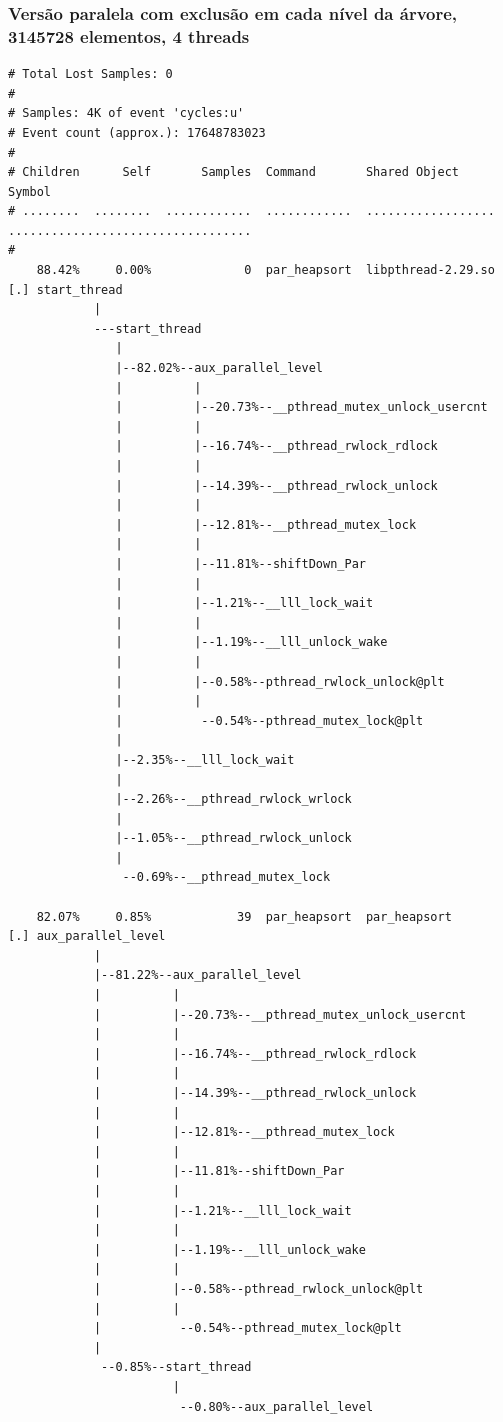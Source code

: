 \documentclass{article}
\begin{document}
\subsubsection{Versão paralela com exclusão em cada nível da árvore, 3145728 elementos, 4 threads}
\scriptsize
\begin{verbatim}
# Total Lost Samples: 0
#
# Samples: 4K of event 'cycles:u'
# Event count (approx.): 17648783023
#
# Children      Self       Samples  Command       Shared Object       Symbol
# ........  ........  ............  ............  ..................  ..................................
#
    88.42%     0.00%             0  par_heapsort  libpthread-2.29.so  [.] start_thread
            |
            ---start_thread
               |
               |--82.02%--aux_parallel_level
               |          |
               |          |--20.73%--__pthread_mutex_unlock_usercnt
               |          |
               |          |--16.74%--__pthread_rwlock_rdlock
               |          |
               |          |--14.39%--__pthread_rwlock_unlock
               |          |
               |          |--12.81%--__pthread_mutex_lock
               |          |
               |          |--11.81%--shiftDown_Par
               |          |
               |          |--1.21%--__lll_lock_wait
               |          |
               |          |--1.19%--__lll_unlock_wake
               |          |
               |          |--0.58%--pthread_rwlock_unlock@plt
               |          |
               |           --0.54%--pthread_mutex_lock@plt
               |
               |--2.35%--__lll_lock_wait
               |
               |--2.26%--__pthread_rwlock_wrlock
               |
               |--1.05%--__pthread_rwlock_unlock
               |
                --0.69%--__pthread_mutex_lock

    82.07%     0.85%            39  par_heapsort  par_heapsort        [.] aux_parallel_level
            |
            |--81.22%--aux_parallel_level
            |          |
            |          |--20.73%--__pthread_mutex_unlock_usercnt
            |          |
            |          |--16.74%--__pthread_rwlock_rdlock
            |          |
            |          |--14.39%--__pthread_rwlock_unlock
            |          |
            |          |--12.81%--__pthread_mutex_lock
            |          |
            |          |--11.81%--shiftDown_Par
            |          |
            |          |--1.21%--__lll_lock_wait
            |          |
            |          |--1.19%--__lll_unlock_wake
            |          |
            |          |--0.58%--pthread_rwlock_unlock@plt
            |          |
            |           --0.54%--pthread_mutex_lock@plt
            |
             --0.85%--start_thread
                       |
                        --0.80%--aux_parallel_level


\end{verbatim}
\end{document}
